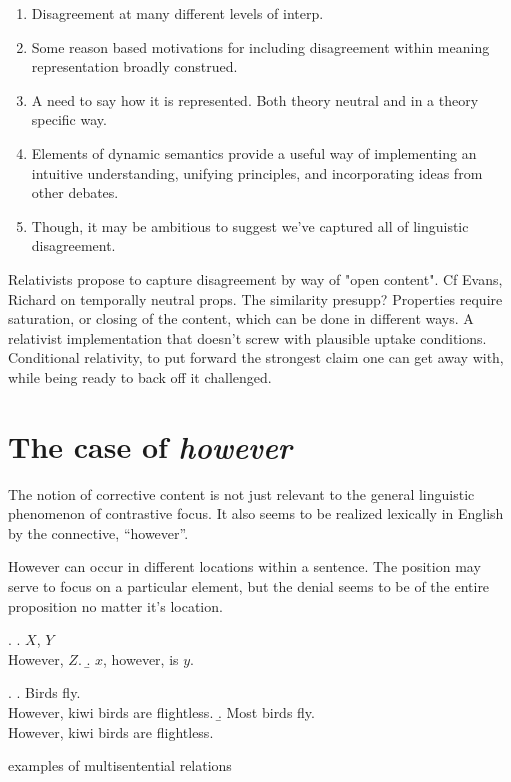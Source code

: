 \documentclass[letterpaper,10pt]{article}
\begin{document}
\begin{enumerate}
  \item Disagreement at many different levels of interp.
  \item Some reason based motivations for including disagreement within meaning representation broadly construed.
  \item A need to say how it is represented. Both theory neutral and in a theory specific way.
  \item Elements of dynamic semantics provide a useful way of implementing an intuitive understanding, unifying principles, and incorporating ideas from other debates.
  \item Though, it may be ambitious to suggest we've captured all of linguistic disagreement.
\end{enumerate}
  
Relativists propose to capture disagreement by way of "open content". Cf Evans, Richard on temporally neutral props.
The similarity presupp? Properties require saturation, or closing of the content, which can be done in different ways.
A relativist implementation that doesn't screw with plausible uptake conditions.
Conditional relativity, to put forward the strongest claim one can get away with, while being ready to back off it challenged.

\section{The case of \textit{however}}
The notion of corrective content is not just relevant to the general linguistic phenomenon of contrastive focus.  It also seems to be realized lexically in English by the connective, ``however''.

However can occur in different locations within a sentence.  The position may serve to focus on a particular element, but the denial seems to be of the entire proposition no matter it's location.

\ex. \a. $X$, $Y$ \\ However, $Z$.
\b. $x$, however, is $y$.

\ex. \a. Birds fly. \\ However, kiwi birds are flightless.
\b. Most birds fly. \\ However, kiwi birds are flightless.

examples of multisentential relations
\end{document}

